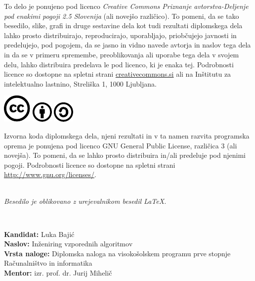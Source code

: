 \documentclass[a4paper,12pt,openright]{book}
\newcommand{\clearemptydoublepage}{\newpage{\pagestyle{empty}\cleardoublepage}}
\newcommand{\CcImageCc}[1]{%
	\includegraphics[scale=#1]{cc_cc_30.pdf}%
}
\newcommand{\CcImageBy}[1]{%
	\includegraphics[scale=#1]{cc_by_30.pdf}%
}
\newcommand{\CcImageSa}[1]{%
	\includegraphics[scale=#1]{cc_sa_30.pdf}%
}
\begin{document}
\newpage
\thispagestyle{empty}

\vspace*{5cm}
{\small \noindent
To delo je ponujeno pod licenco \textit{Creative Commons Priznanje avtorstva-Deljenje pod enakimi pogoji 2.5 Slovenija} (ali novej\v so razli\v cico).
To pomeni, da se tako besedilo, slike, grafi in druge sestavine dela kot tudi rezultati diplomskega dela lahko prosto distribuirajo,
reproducirajo, uporabljajo, priobčujejo javnosti in predelujejo, pod pogojem, da se jasno in vidno navede avtorja in naslov tega
dela in da se v primeru spremembe, preoblikovanja ali uporabe tega dela v svojem delu, lahko distribuira predelava le pod
licenco, ki je enaka tej.
Podrobnosti licence so dostopne na spletni strani \href{http://creativecommons.si}{creativecommons.si} ali na Inštitutu za
intelektualno lastnino, Streliška 1, 1000 Ljubljana.

\vspace*{1cm}
\begin{center}%
\CcImageCc{0.741573033707865}\hspace*{1ex}\CcImageBy{1}\hspace*{1ex}\CcImageSa{1}%
\end{center}
}

\vspace*{1cm}
{\small \noindent
Izvorna koda diplomskega dela, njeni rezultati in v ta namen razvita programska oprema je ponujena pod licenco GNU General Public License,
različica 3 (ali novejša). To pomeni, da se lahko prosto distribuira in/ali predeluje pod njenimi pogoji.
Podrobnosti licence so dostopne na spletni strani \url{http://www.gnu.org/licenses/}.
}

\vfill
\begin{center} 
\ \\ \vfill
{\em
Besedilo je oblikovano z urejevalnikom besedil \LaTeX.}
\end{center}

\clearemptydoublepage

\thispagestyle{empty}
\
\vfill

\bigskip
\noindent\textbf{Kandidat:} Luka Bajić\\
\noindent\textbf{Naslov:} Inženiring vzporednih algoritmov\\
\noindent\textbf{Vrsta naloge:} Diplomska naloga na visokošolskem programu prve stopnje Računalništvo in informatika \\
\noindent\textbf{Mentor:} izr. prof. dr. Jurij Mihelič\\
\end{document}
